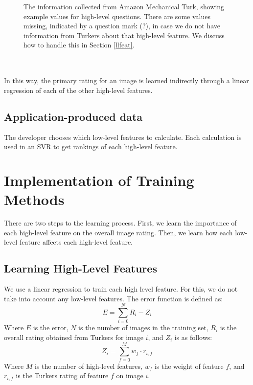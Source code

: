 \documentclass[11pt,letter]{article}
\begin{document}
\begin{figure}
\centering
{}
\caption{The information collected from Amazon Mechanical Turk, showing example values for high-level questions. There are some values missing, indicated by a question mark (?), in case we do not have information from Turkers about that high-level feature. We discuss how to handle this in Section \ref{llfeat}.}
\label{fig:turktable}
\end{figure}

\\
\\

In this way, the primary rating for an image is learned indirectly through a linear regression of each of the other high-level features.

\subsection{Application-produced data}
The developer chooses which low-level features to calculate. Each calculation is used in an SVR to get rankings of each high-level feature.

\section{Implementation of Training Methods}
\label{methods}

There are two steps to the learning process. First, we learn the importance of each high-level feature on the overall image rating. Then, we learn how each low-level feature affects each high-level feature.

\subsection{Learning High-Level Features}
We use a linear regression to train each high level feature. For this, we do not take into account any low-level features. The error function is defined as:
\[
E=\displaystyle\sum\limits_{i=0}^N R_i-Z_i
\]
Where $E$ is the error, $N$ is the number of images in the training set, $R_i$ is the overall rating obtained from Turkers for image $i$, and $Z_i$ is as follows:
\[
Z_i=\displaystyle\sum\limits_{f=0}^M w_f \cdot r_{i,f}
\]
Where $M$ is the number of high-level features, $w_f$ is the weight of feature $f$, and $r_{i,f}$ is the Turkers rating of feature $f$ on image $i$.
\end{document}

